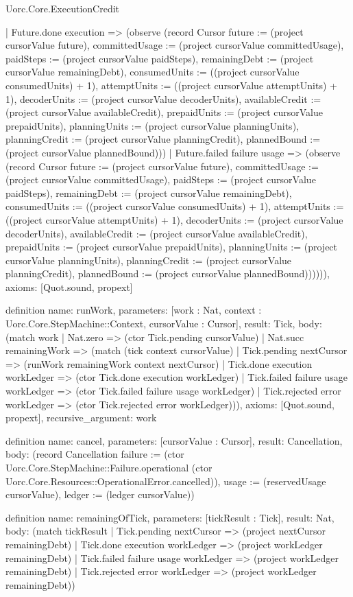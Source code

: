 \begin{lexlean}{Uorc.Core.ExecutionCredit}
\begin{semanticmodule}
{    | Future.done execution => (observe (record Cursor {future := (project cursorValue future), committedUsage := (project cursorValue committedUsage), paidSteps := (project cursorValue paidSteps), remainingDebt := (project cursorValue remainingDebt), consumedUnits := ((project cursorValue consumedUnits) + 1), attemptUnits := ((project cursorValue attemptUnits) + 1), decoderUnits := (project cursorValue decoderUnits), availableCredit := (project cursorValue availableCredit), prepaidUnits := (project cursorValue prepaidUnits), planningUnits := (project cursorValue planningUnits), planningCredit := (project cursorValue planningCredit), plannedBound := (project cursorValue plannedBound)}))
    | Future.failed failure usage => (observe (record Cursor {future := (project cursorValue future), committedUsage := (project cursorValue committedUsage), paidSteps := (project cursorValue paidSteps), remainingDebt := (project cursorValue remainingDebt), consumedUnits := ((project cursorValue consumedUnits) + 1), attemptUnits := ((project cursorValue attemptUnits) + 1), decoderUnits := (project cursorValue decoderUnits), availableCredit := (project cursorValue availableCredit), prepaidUnits := (project cursorValue prepaidUnits), planningUnits := (project cursorValue planningUnits), planningCredit := (project cursorValue planningCredit), plannedBound := (project cursorValue plannedBound)}))))),
  axioms: [Quot.sound, propext]
}

definition{
  name: runWork,
  parameters: [work : Nat, context : Uorc.Core.StepMachine::Context, cursorValue : Cursor],
  result: Tick,
  body: (match work
    | Nat.zero => (ctor Tick.pending cursorValue)
    | Nat.succ remainingWork => (match (tick context cursorValue)
      | Tick.pending nextCursor => (runWork remainingWork context nextCursor)
      | Tick.done execution workLedger => (ctor Tick.done execution workLedger)
      | Tick.failed failure usage workLedger => (ctor Tick.failed failure usage workLedger)
      | Tick.rejected error workLedger => (ctor Tick.rejected error workLedger))),
  axioms: [Quot.sound, propext],
  recursive_argument: work
}

definition{
  name: cancel,
  parameters: [cursorValue : Cursor],
  result: Cancellation,
  body: (record Cancellation {failure := (ctor Uorc.Core.StepMachine::Failure.operational (ctor Uorc.Core.Resources::OperationalError.cancelled)), usage := (reservedUsage cursorValue), ledger := (ledger cursorValue)})
}

definition{
  name: remainingOfTick,
  parameters: [tickResult : Tick],
  result: Nat,
  body: (match tickResult
    | Tick.pending nextCursor => (project nextCursor remainingDebt)
    | Tick.done execution workLedger => (project workLedger remainingDebt)
    | Tick.failed failure usage workLedger => (project workLedger remainingDebt)
    | Tick.rejected error workLedger => (project workLedger remainingDebt))
}


\end{semanticmodule}
\end{lexlean}
